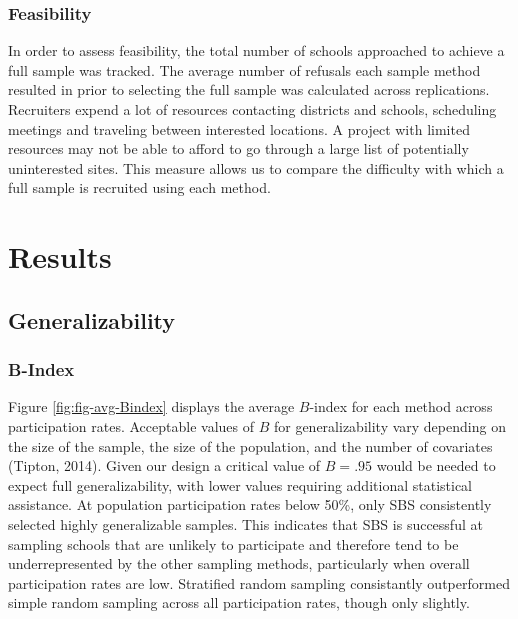 \documentclass[man,floatsintext]{apa6}
\begin{document}
\hypertarget{feasibility}{%
\subsubsection{Feasibility}\label{feasibility}}

In order to assess feasibility, the total number of schools approached to achieve a full sample was tracked. The average number of refusals each sample method resulted in prior to selecting the full sample was calculated across replications. Recruiters expend a lot of resources contacting districts and schools, scheduling meetings and traveling between interested locations. A project with limited resources may not be able to afford to go through a large list of potentially uninterested sites. This measure allows us to compare the difficulty with which a full sample is recruited using each method.

\hypertarget{results}{%
\section{Results}\label{results}}

\hypertarget{generalizability-1}{%
\subsection{Generalizability}\label{generalizability-1}}

\hypertarget{b-index}{%
\subsubsection{B-Index}\label{b-index}}

Figure \ref{fig:fig-avg-Bindex} displays the average \(B\)-index for each method across participation rates. Acceptable values of \(B\) for generalizability vary depending on the size of the sample, the size of the population, and the number of covariates (Tipton, 2014). Given our design a critical value of \(B = .95\) would be needed to expect full generalizability, with lower values requiring additional statistical assistance. At population participation rates below 50\%, only SBS consistently selected highly generalizable samples. This indicates that SBS is successful at sampling schools that are unlikely to participate and therefore tend to be underrepresented by the other sampling methods, particularly when overall participation rates are low. Stratified random sampling consistantly outperformed simple random sampling across all participation rates, though only slightly.
\end{document}
